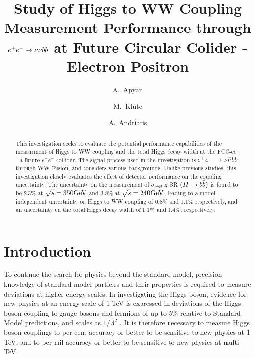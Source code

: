 \documentclass[preprintnumbers,nofootinbib,noshowpacs,eqsecnum,prd,superscriptaddress,letterpaper]{revtex4}
\begin{document}
\title{Study of Higgs to WW Coupling Measurement Performance through $e^+e^-\rightarrow\nu\bar{\nu} b\bar{b}$ at Future
Circular Colider - Electron Positron}

\author{A.~Apyan}
\author{M.~Klute}
\author{A.~Andriatis}

\begin{abstract}
This investigation seeks to evaluate the potential performance capabilities of the measurment of Higgs to WW coupling and the total Higgs decay width at the FCC-ee - a future $e^+e^-$ collider. The signal process used in the investigation is $e^+e^-\rightarrow\nu\bar{\nu} b\bar{b}$ through WW Fusion, and considers various backgrounds. Unlike previous studies, this investigation closely evaluates the effect of detector performance on the coupling uncertainty. The uncertainty on the measurement of  $\sigma_{\nu\bar{\nu}H}$ x BR $(H \rightarrow b\bar{b})$ is found to be 2.3\% at $\sqrt{s} = 350 \text{GeV}$ and 3.8\% at $\sqrt{s} = 240 \text{GeV}$, leading to a model-independent uncertainty on Higgs to WW coupling of 0.8\% and 1.1\% respectively, and an uncertainty on the total Higgs decay width of 1.1\% and 1.4\%, respectively.
\end{abstract}

\maketitle
\tableofcontents
\newpage

\section{Introduction}
\label{sec:intro}


To continue the search for physics beyond the standard model, precision knowledge of standard-model particles and their properties is required to measure deviations at higher energy scales. In investigating the Higgs boson, evidence for new physics at an energy scale of 1 TeV is expressed in deviations of the Higgs boson coupling to gauge bosons and fermions of up to 5\% relative to Standard Model predictions, and scales as $1/{\Lambda^2}$ \cite{tlep}. It is therefore necessary to measure Higgs boson couplings to per-cent accuracy or better to be sensitive to new physics at 1 TeV, and to per-mil accuracy or better to be sensitive to new  physics at multi-TeV.
\end{document}
